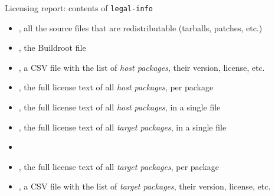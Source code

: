 \begin{frame}{Licensing report: contents of {\tt legal-info}}
  \begin{itemize}
  \item {}, all the source files that are redistributable
    (tarballs, patches, etc.)
  \item {}, the Buildroot  file
  \item {}, a CSV file with the list of {\em
      host packages}, their version, license, etc.
  \item {}, the full license text of all {\em
      host packages}, per package
  \item {}, the full license text of all {\em
      host packages}, in a single file
  \item {}, the full license text of all {\em target
      packages}, in a single file
  \item {}
  \item {}, the full license text of all {\em target
      packages}, per package
  \item {}, a CSV file with the list of {\em target
      packages}, their version, license, etc.
  \end{itemize}
\end{frame}

